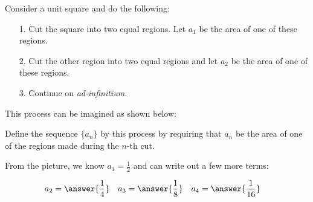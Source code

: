 \documentclass{ximera}
\author{Jim Talamo and Bart Snapp}
\begin{document}
\begin{exercise}

Consider a unit square and do the following: 

\begin{itemize}
\item[1.] Cut the square into two equal regions. Let
  $a_1$ be the area of one of these regions. 
\item[2.] Cut the other region into
  two equal regions and let $a_2$ be the area of one of these
  regions. 
\item[3.] Continue on \textit{ad-infinitium}.  
\end{itemize}

This process can be imagined as shown below:
  \begin{image}[2in]
  \end{image}
  
Define the sequence $\{a_n\}$ by this process by requiring that $a_n$ be the area of one of the regions made during the $n$-th cut.

    From the picture, we know $a_1 = \frac{1}{2}$ and can write out a few more terms:
    
\begin{align*}
a_2&= \answer{\frac{1}{4}} & a_3&= \answer{\frac{1}{8}} & a_4&= \answer{\frac{1}{16}} 
\end{align*}


\end{exercise}
\end{document}
